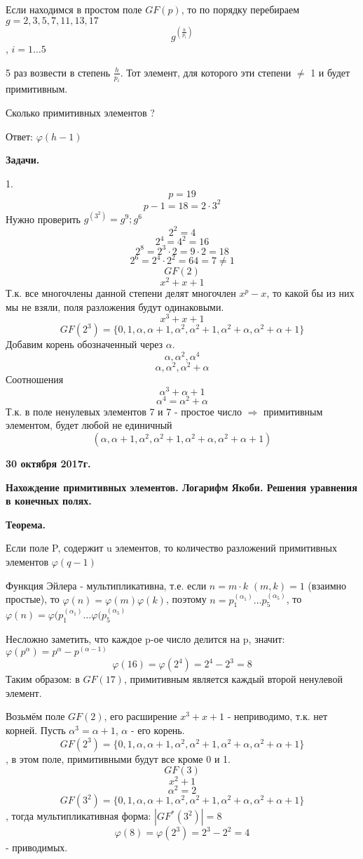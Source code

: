 \documentclass{article}
\begin{document}
Если находимся в простом поле $GF(p)$, то по порядку перебираем $g=2, 3, 5, 7, 11, 13, 17$
$$g^(\frac{h}{p_i})$$, $i=1 \ldots 5$ 

5 раз возвести в степень $\frac{h}{p_i}$. Тот элемент, для которого эти степени $\ne$ 1 и будет примитивным.

Сколько примитивных элементов ?

Ответ: $\varphi(h-1)$

{\bf Задачи.}

1. $$p=19$$
$$p-1 =18=2\cdot 3^2$$
Нужно проверить $g^(3^2)=g^9; g^6$
$$2^2=4$$
$$2^4=4^2=16$$
$$2^8=2^3\cdot 2=9\cdot 2=18$$
$$2^6=2^4\cdot2^2=64=7\ne 1$$
$$GF(2)$$
$$x^2+x+1$$
Т.к. все многочлены данной степени делят многочлен $x^p-x$, то какой бы из них мы не взяли, поля разложения будут одинаковыми.
$$x^3+x+1$$
$$GF(2^3)=\{0,1,\alpha, \alpha +1, \alpha^2, \alpha^2+1, \alpha^2+\alpha, \alpha^2+\alpha+1\}$$
Добавим корень обозначенный через $\alpha$.
$$\alpha, \alpha^2, \alpha^4$$
$$\alpha, \alpha^2, \alpha^2+\alpha$$
Соотношения $$\alpha^3+\alpha+1$$
$$\alpha^4=\alpha^2+\alpha$$
Т.к. в поле ненулевых элементов 7 и 7 - простое число $\Rightarrow$ примитивным элементом, будет любой не единичный $$(\alpha, \alpha +1, \alpha^2, \alpha^2+1, \alpha^2+\alpha, \alpha^2+\alpha+1)$$

\textbf {30 октября 2017г.}

{\bf Нахождение примитивных элементов. Логарифм Якоби. Решения уравнения в конечных полях.}

{\bf Теорема.}

Если поле P, содержит u элементов, то количество разложений примитивных элементов $\varphi(q-1)$

Функция Эйлера - мультипликативна, т.е. если $n=m\cdot k$    $ (m, k)=1$ (взаимно простые), то $\varphi(n) = \varphi(m)\varphi(k)$, поэтому $n=p^(\alpha_1)_1 \ldots p^(\alpha_5)_5$, то $\varphi(n) = \varphi(p^(\alpha_1)_1 \ldots \varphi(p^(\alpha_5)_5$

Несложно заметить, что каждое p-ое число делится на p, значит: $\varphi(p^\alpha)=p^\alpha-p^(\alpha-1)$
$$\varphi(16)=\varphi(2^4)=2^4-2^3=8$$
Таким образом: в $GF(17)$, примитивным является каждый второй ненулевой элемент.

Возьмём поле $GF(2)$, его расширение $x^3+x+1$ -  неприводимо, т.к. нет корней. Пусть $\alpha^3=\alpha+1$, $\alpha$ - его корень.
$$GF(2^3)=\{0,1,\alpha, \alpha +1, \alpha^2, \alpha^2+1, \alpha^2+\alpha, \alpha^2+\alpha+1\}$$, в этом поле, примитивными будут все кроме 0 и 1.
$$GF(3)$$
$$x^2+1$$
$$\alpha^2=2$$
$$GF(3^2)=\{0,1,\alpha, \alpha +1, \alpha^2, \alpha^2+1, \alpha^2+\alpha, \alpha^2+\alpha+1\}$$, тогда мультипликативная форма: $|GF^* (3^2)|=8$
$$\varphi(8)=\varphi(2^3)=2^3-2^2=4$$ - приводимых.
\end{document}

